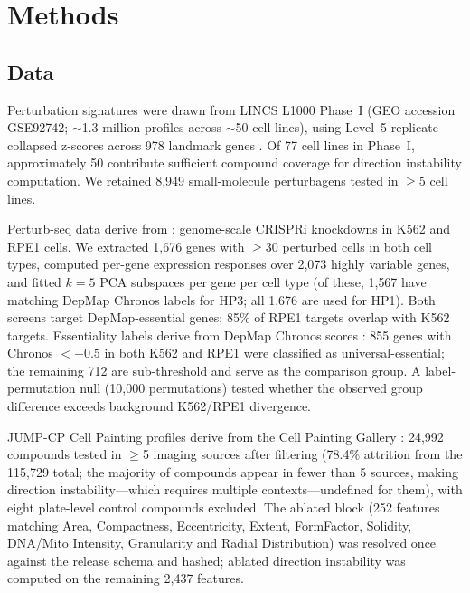 \documentclass[11pt]{article}
\begin{document}
\section{Methods}

\subsection{Data}

Perturbation signatures were drawn from LINCS L1000 Phase~I (GEO accession
GSE92742; $\sim$1.3 million profiles across $\sim$50 cell lines),
using Level~5 replicate-collapsed z-scores across 978 landmark genes
\citep{subramanian2017next,keenan2018library}. Of 77 cell lines in Phase~I,
approximately 50 contribute sufficient compound coverage for direction
instability computation. We retained 8{,}949
small-molecule perturbagens tested in $\geq5$ cell lines.

Perturb-seq data derive from \citet{replogle2022mapping}: genome-scale
CRISPRi knockdowns in K562 and RPE1 cells. We extracted 1{,}676 genes
with $\geq$30 perturbed cells in both cell types, computed per-gene
expression responses over 2{,}073 highly variable genes, and fitted
$k = 5$ PCA subspaces per gene per cell type (of these, 1{,}567 have
matching DepMap Chronos labels for HP3; all 1{,}676 are used for HP1).
Both screens target DepMap-essential genes; 85\% of RPE1 targets overlap
with K562 targets. Essentiality labels derive from DepMap Chronos scores
\citep{dempster2021chronos}: 855 genes with Chronos $< -0.5$ in both
K562 and RPE1 were classified as universal-essential; the remaining 712
are sub-threshold and serve as the comparison group. A label-permutation
null (10{,}000 permutations) tested whether the observed group difference
exceeds background K562/RPE1 divergence.

JUMP-CP Cell Painting profiles derive from the Cell Painting Gallery
\citep{chandrasekaran2023jump}: 24{,}992 compounds tested in $\geq$5
imaging sources after filtering (78.4\% attrition from the 115{,}729
total; the majority of compounds appear in fewer than 5 sources,
making direction instability---which requires multiple
contexts---undefined for them), with eight plate-level control compounds
excluded. The ablated block (252 features matching Area, Compactness,
Eccentricity, Extent, FormFactor, Solidity, DNA/Mito Intensity,
Granularity and Radial Distribution) was resolved once against the release
schema and hashed; ablated direction instability was computed
on the remaining 2{,}437 features.
\end{document}

